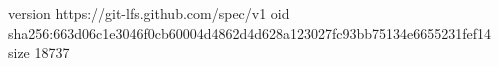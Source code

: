 version https://git-lfs.github.com/spec/v1
oid sha256:663d06c1e3046f0cb60004d4862d4d628a123027fc93bb75134e6655231fef14
size 18737
